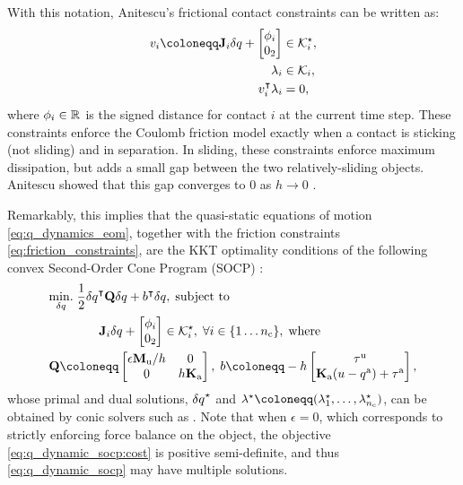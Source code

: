 With this notation, Anitescu's frictional contact constraints can be written as:
\begin{subequations}
\label{eq:friction_constraints}
\begin{align}
v_i \coloneqq 
\J_i
{\delta q}
+
\begin{bmatrix}
\phi_i \\
0_2
\end{bmatrix}
&\in \mathcal{K}_i^\star, \label{eq:friction_constraints:v_i}\\
\lambda_i &\in \mathcal{K}_i, \\
v_i^\intercal \lambda_i &= 0, \label{eq:friction_constraints:complementary_slackness}
\end{align}
\end{subequations}
where $\phi_i \in \mathbb{R}^{}$ is the signed distance for contact $i$ at the current time step. These constraints enforce the Coulomb friction model exactly when a contact is sticking (not sliding) and in separation. In sliding, these constraints enforce maximum dissipation, but adds a small gap between the two relatively-sliding objects. Anitescu showed that this gap converges to 0 as $h \rightarrow 0$ \cite{anitescu2006optimization}.

Remarkably, this implies that the quasi-static equations of motion \eqref{eq:q_dynamics_eom}, together with the friction constraints \eqref{eq:friction_constraints}, are the KKT optimality conditions \cite[]{boyd2004convex} of the following convex Second-Order Cone Program (SOCP) \cite{anitescu2006optimization}:
\begin{subequations}
\label{eq:q_dynamic_socp}
\begin{align}
&\underset{\dq}{\minimize} \; \frac{1}{2} \dq^\intercal \mathbf{Q} \dq + b^\intercal \dq, \; \text{subject to} \label{eq:q_dynamic_socp:cost}\\
&\qquad \qquad \J_i
{\delta q}
+
\begin{bmatrix}
\phi_i \\
0_2
\end{bmatrix}
\in \mathcal{K}_i^\star, \; \forall i \in \{1 \dots \nC\}, \; \text{where} \label{eq:q_dynamic_socp:constraint}\\
&\mathbf{Q} \coloneqq \begin{bmatrix} \epsilon \Mu/h & 0 \\ 0 & h \Ka \end{bmatrix}, \;
b \coloneqq - h\begin{bmatrix} \tauU \\ \Ka(u - \qa) + \tauA \end{bmatrix}, \label{eq:q_dynamic_socp:Q_and_b}
\end{align}
\end{subequations}
whose primal and dual solutions, ${\delta q}^\star$ and $\lambda^\star \coloneqq (\lambda_1^\star, \dots, \lambda_{\nC}^\star)$, can be obtained by conic solvers such as \cite{mosek, scs}. Note that when $\epsilon=0$, which corresponds to strictly enforcing force balance on the object, the objective \eqref{eq:q_dynamic_socp:cost} is positive semi-definite, and thus \eqref{eq:q_dynamic_socp} may have multiple solutions.  

